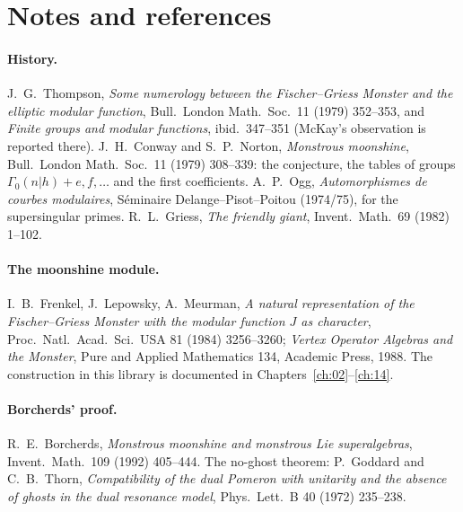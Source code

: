 \section{Notes and references}\label{ch16:sec:notes}

\paragraph{History.}  J.~G.~Thompson, \emph{Some numerology between the Fischer--Griess Monster and the elliptic modular
function}, Bull.\ London Math.\ Soc.\ 11 (1979) 352--353, and \emph{Finite groups and modular functions}, ibid.\
347--351 (McKay's observation is reported there).  J.~H.~Conway and S.~P.~Norton, \emph{Monstrous moonshine}, Bull.\
London Math.\ Soc.\ 11 (1979) 308--339: the conjecture, the tables of groups $\Gamma_0(n|h)+e,f,\dots$ and the first
coefficients.  A.~P.~Ogg, \emph{Automorphismes de courbes modulaires}, S\'eminaire Delange--Pisot--Poitou (1974/75),
for the supersingular primes.  R.~L.~Griess, \emph{The friendly giant}, Invent.\ Math.\ 69 (1982) 1--102.

\paragraph{The moonshine module.}  I.~B.~Frenkel, J.~Lepowsky, A.~Meurman, \emph{A natural representation of the
Fischer--Griess Monster with the modular function $J$ as character}, Proc.\ Natl.\ Acad.\ Sci.\ USA 81 (1984)
3256--3260; \emph{Vertex Operator Algebras and the Monster}, Pure and Applied Mathematics 134, Academic Press, 1988.
The construction in this library is documented in Chapters~\ref{ch:02}--\ref{ch:14}.

\paragraph{Borcherds' proof.}  R.~E.~Borcherds, \emph{Monstrous moonshine and monstrous Lie superalgebras}, Invent.\
Math.\ 109 (1992) 405--444.  The no-ghost theorem: P.~Goddard and C.~B.~Thorn, \emph{Compatibility of the dual Pomeron
with unitarity and the absence of ghosts in the dual resonance model}, Phys.\ Lett.\ B 40 (1972) 235--238.

